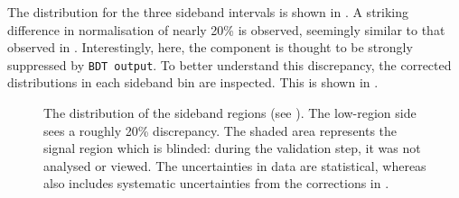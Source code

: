 The \EB distribution for the three \EB sideband intervals is shown in .
A striking difference in normalisation of nearly 20\% is observed, 
seemingly similar to that observed in .
Interestingly, here, the \epem\ra\qqbar component is thought to be strongly suppressed by \texttt{BDT~output}.
To better understand this discrepancy, the corrected \Mbc distributions in each \EB sideband bin are inspected.
This is shown in .
\begin{figure}[htbp!]
    \centering
    \caption{\label{fig:sidebands_eb} 
    The \EB distribution of the \EB sideband regions (see ).
    The low-\EB region side sees a roughly 20\% discrepancy.
    The shaded area represents the signal region which is blinded: during the validation step, it was not analysed or viewed.
    The uncertainties in data are statistical, whereas \MC also includes systematic uncertainties from the corrections in .
    }
\end{figure}
